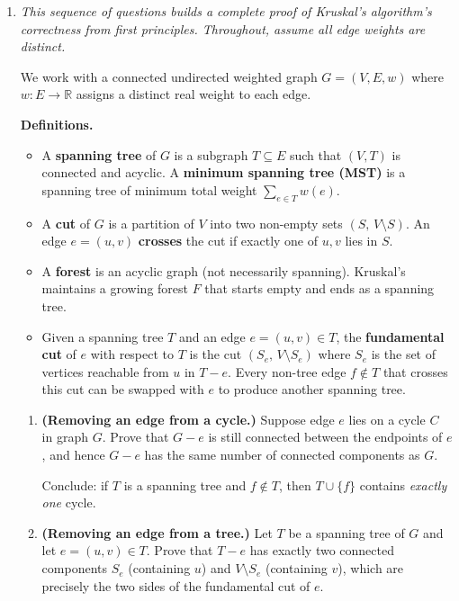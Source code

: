 \documentclass[9pt]{book}
\begin{document}
\begin{enumerate}[label=\arabic*.]
\item \textit{This sequence of questions builds a complete proof of Kruskal's algorithm's correctness from first principles. Throughout, assume all edge weights are distinct.}

We work with a connected undirected weighted graph $G = (V, E, w)$ where $w : E \to \mathbb{R}$ assigns a distinct real weight to each edge.

\medskip
\textbf{Definitions.}
\begin{itemize}
    \item A \textbf{spanning tree} of $G$ is a subgraph $T \subseteq E$ such that $(V, T)$ is connected and acyclic. A \textbf{minimum spanning tree (MST)} is a spanning tree of minimum total weight $\sum_{e \in T} w(e)$.
    \item A \textbf{cut} of $G$ is a partition of $V$ into two non-empty sets $(S,\, V \setminus S)$. An edge $e = (u,v)$ \textbf{crosses} the cut if exactly one of $u, v$ lies in $S$.
    \item A \textbf{forest} is an acyclic graph (not necessarily spanning). Kruskal's maintains a growing forest $F$ that starts empty and ends as a spanning tree.
    \item Given a spanning tree $T$ and an edge $e = (u,v) \in T$, the \textbf{fundamental cut} of $e$ with respect to $T$ is the cut $(S_e,\, V \setminus S_e)$ where $S_e$ is the set of vertices reachable from $u$ in $T - e$. Every non-tree edge $f \notin T$ that crosses this cut can be swapped with $e$ to produce another spanning tree.
\end{itemize}

\begin{enumerate}
    \item \textbf{(Removing an edge from a cycle.)}
    Suppose edge $e$ lies on a cycle $C$ in graph $G$. Prove that $G - e$ is still connected between the endpoints of $e$, and hence $G - e$ has the same number of connected components as $G$.

    Conclude: if $T$ is a spanning tree and $f \notin T$, then $T \cup \{f\}$ contains \emph{exactly one} cycle.

    \item \textbf{(Removing an edge from a tree.)}
    Let $T$ be a spanning tree of $G$ and let $e = (u,v) \in T$. Prove that $T - e$ has exactly two connected components $S_e$ (containing $u$) and $V \setminus S_e$ (containing $v$), which are precisely the two sides of the fundamental cut of $e$.


\end{enumerate}
\end{enumerate}
\end{document}
